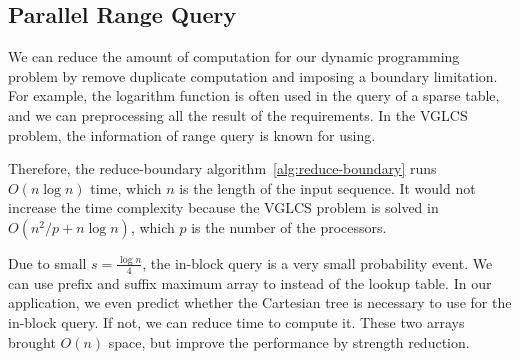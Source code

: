 \subsection{Parallel Range Query}

We can reduce the amount of computation for our dynamic programming
problem by remove duplicate computation and imposing a boundary
limitation.  For example, the logarithm function is often used in the
query of a sparse table, and we can preprocessing all the result of the
requirements.  In the VGLCS problem, the information of range query is
known for using.  %

Therefore, the reduce-boundary 
algorithm~\ref{alg:reduce-boundary} runs $O(n \log n)$ time, which $n$ 
is the length of the input sequence.  It would not increase the time 
complexity because the VGLCS problem is solved in 
$O(n^2 / p + n \log n)$, which $p$ is the number of the processors.


\iffalse
運行區間查找時，一般依賴內建函數在 $O(1)$ 時間完成對數取整，
然而，在 VGLCS 這類型的動態規劃中，區間查找的對數結果是可以被預測的，預先將每一組詢問的區段對數結果儲存在陣列中，便可降低指令次數。
\fi

\iffalse
由於已知所有詢問區間，建立稀疏表時，可藉由動態規劃在 $O(n \log n)$ 排除掉不可能的計算 (參照算法 ~\ref{alg:reduce-boundary})，
降低過程中的計算量。由於 VGLCS 在平行操作需要 $O(n \log n)$，故使用動態規劃不影響我們的最終結果。
\fi



Due to small $s = \frac{\log n}{4}$, the in-block query is a very
small probability event.  We can use prefix and suffix maximum array
to instead of the lookup table.  In our application, we even predict
whether the Cartesian tree is necessary to use for the in-block query.
If not, we can reduce time to compute it.  These two arrays brought
$O(n)$ space, but improve the performance by strength reduction.

\iffalse
從機率分佈的角度來看，因 $s = \frac{1}{4} \log n$ 過小，區間詢問完全落於 block 的機率低，
故額外維護區段前綴和後綴最大值 (prefix/suffix maximum value in block) 取代笛卡爾樹的建立。
藉這兩個額外儲存空間，將會增加空間複雜度的常數，卻能有效地降低整體的指令次數。
\fi
